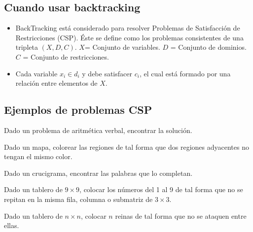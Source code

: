 \documentclass{templateNote}
\begin{document}
\subsection*{Cuando usar backtracking}
\begin{itemize}
    \item BackTracking está considerado para resolver Problemas de Satisfacción de Restricciones (CSP).
    Éste se define como los problemas consistentes de una tripleta $(X,D,C)$.
    \subitem $X$= Conjunto de variables.
    \subitem $D$ = Conjunto de dominios.
    \subitem $C$ = Conjunto de restricciones.
    
    \item Cada variable $x_i \in d_i$ y debe satisfacer $c_i$, el cual está formado por una relación entre elementos de $X$.
    
\end{itemize}


\subsection*{Ejemplos de problemas CSP}

\begin{tcolorbox}[colback=blue!4!white,colframe=blue!75!black,title=Aritmética Verbal]
    Dado un problema de aritmética verbal, encontrar la solución.
\end{tcolorbox}

\begin{tcolorbox}[colback=blue!4!white,colframe=blue!75!black,title=Coloración de mapas]
    Dado un mapa, colorear las regiones de tal forma que dos regiones adyacentes no tengan el mismo color.
\end{tcolorbox}

\begin{tcolorbox}[colback=blue!4!white,colframe=blue!75!black,title=Crucigramas]
    Dado un crucigrama, encontrar las palabras que lo completan.
\end{tcolorbox}

\begin{tcolorbox}[colback=blue!4!white,colframe=blue!75!black,title=Sudoku]
    Dado un tablero de $9 \times 9$, colocar los números del 1 al 9 de tal forma que no se repitan en la misma fila, columna o submatriz de $3 \times 3$.
\end{tcolorbox}

\begin{tcolorbox}[colback=blue!4!white,colframe=blue!75!black,title=Problema de las $n$ reinas]
    Dado un tablero de $n \times n$, colocar $n$ reinas de tal forma que no se ataquen entre ellas.
\end{tcolorbox}
\end{document}

